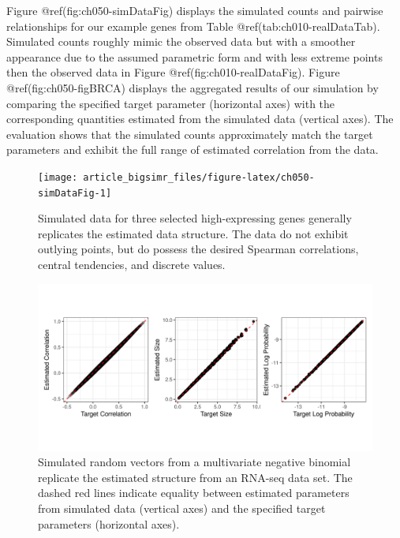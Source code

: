 \documentclass[
]{jss}
\begin{document}
Figure @ref(fig:ch050-simDataFig) displays the simulated counts and
pairwise relationships for our example genes from Table
@ref(tab:ch010-realDataTab). Simulated counts roughly mimic the observed
data but with a smoother appearance due to the assumed parametric form
and with less extreme points then the observed data in Figure
@ref(fig:ch010-realDataFig). Figure @ref(fig:ch050-figBRCA) displays the
aggregated results of our simulation by comparing the specified target
parameter (horizontal axes) with the corresponding quantities estimated
from the simulated data (vertical axes). The evaluation shows that the
simulated counts approximately match the target parameters and exhibit
the full range of estimated correlation from the data.

\begin{CodeChunk}
\begin{figure}

{\centering \texttt{[image: article\_bigsimr\_files/figure-latex/ch050-simDataFig-1]} 

}

\caption[Simulated data for three selected high-expressing genes generally replicates the estimated data structure]{Simulated data for three selected high-expressing genes generally replicates the estimated data structure. The data do not exhibit outlying points, but do possess the desired Spearman correlations, central tendencies, and discrete values.}\label{fig:ch050-simDataFig}
\end{figure}
\end{CodeChunk}

\begin{CodeChunk}
\begin{figure}

{\centering \includegraphics[width=0.8\linewidth]{fig/ch050-figBRCA} 

}

\caption[Simulated random vectors from a multivariate negative binomial replicate the estimated structure from an RNA-seq data set]{Simulated random vectors from a multivariate negative binomial replicate the estimated structure from an RNA-seq data set. The dashed red lines indicate equality between estimated parameters from simulated data (vertical axes) and the specified target parameters (horizontal axes).}\label{fig:ch050-figBRCA}
\end{figure}
\end{CodeChunk}
\end{document}

